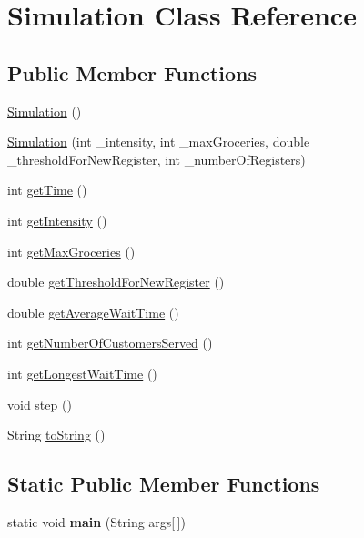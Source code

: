 \hypertarget{class_simulation}{}\section{Simulation Class Reference}
\label{class_simulation}
\subsection*{Public Member Functions}
\begin{DoxyCompactItemize}
\item 
\hyperlink{class_simulation_aa24c4314fd1e140a1b9ad5feb06c6fb0}{Simulation} ()
\item 
\hyperlink{class_simulation_aae94561923d7826c754567121f6b1042}{Simulation} (int \+\_\+intensity, int \+\_\+max\+Groceries, double \+\_\+threshold\+For\+New\+Register, int \+\_\+number\+Of\+Registers)
\item 
int \hyperlink{class_simulation_a1f4d6be58ea9284bbafac04ff9cff2f3}{get\+Time} ()
\item 
int \hyperlink{class_simulation_ab743aabfae74983b6e475caadfc5072f}{get\+Intensity} ()
\item 
int \hyperlink{class_simulation_a60e2eec59d7d04570369d014d2c585c3}{get\+Max\+Groceries} ()
\item 
double \hyperlink{class_simulation_a6685cc83b16bcac230972576a424b742}{get\+Threshold\+For\+New\+Register} ()
\item 
double \hyperlink{class_simulation_a8e21a8270cb67b355d68dcd7b61c3aac}{get\+Average\+Wait\+Time} ()
\item 
int \hyperlink{class_simulation_a98b45946461dbf1f68f4790036b67ac3}{get\+Number\+Of\+Customers\+Served} ()
\item 
int \hyperlink{class_simulation_ac44576077cf39f3c772df0b0f956a460}{get\+Longest\+Wait\+Time} ()
\item 
void \hyperlink{class_simulation_a191a1c3bdd167494288a49206657090c}{step} ()
\item 
String \hyperlink{class_simulation_a62bc9c7d0357063026acf3682b362552}{to\+String} ()
\end{DoxyCompactItemize}
\subsection*{Static Public Member Functions}
\begin{DoxyCompactItemize}
\item 
\hypertarget{class_simulation_a9696222d4b2febd4a35411157f99957f}{}static void {\bfseries main} (String args\mbox{[}$\,$\mbox{]})\label{class_simulation_a9696222d4b2febd4a35411157f99957f}

\end{DoxyCompactItemize}


